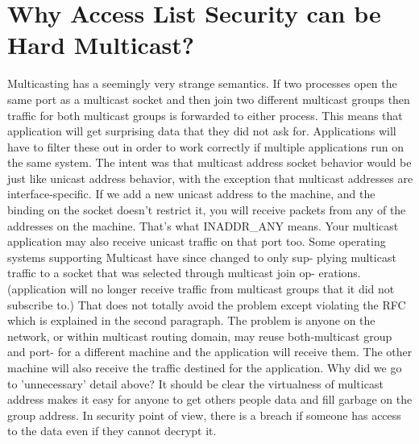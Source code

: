 \section{Why Access List Security can be Hard Multicast?}
Multicasting has a seemingly very strange semantics. If two processes open the
same port as a multicast socket and then join two different multicast groups then
traffic for both multicast groups is forwarded to either process. This means that
application will get surprising data that they did not ask for. Applications will
have to filter these out in order to work correctly if multiple applications run on
the same system.
The intent was that multicast address socket behavior would be just like unicast
address behavior, with the exception that multicast addresses are interface-specific.
If we add a new unicast address to the machine, and the binding on the socket
doesn’t restrict it, you will receive packets from any of the addresses on the machine.
That’s what INADDR\_ANY means. Your multicast application may also receive
unicast traffic on that port too.
Some operating systems supporting Multicast have since changed to only sup-
plying multicast traffic to a socket that was selected through multicast join op-
erations. (application will no longer receive traffic from multicast groups that it
did not subscribe to.) That does not totally avoid the problem except violating
the RFC which is explained in the second paragraph. The problem is anyone on
the network, or within multicast routing domain, may reuse both-multicast group
and port- for a different machine and the application will receive them. The other
machine will also receive the traffic destined for the application.
Why did we go to ’unnecessary’ detail above? It should be clear the virtualness
of multicast address makes it easy for anyone to get others people data and fill
garbage on the group address. In security point of view, there is a breach if someone
has access to the data even if they cannot decrypt it.

